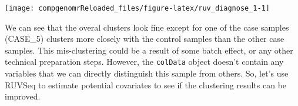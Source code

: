\documentclass[12pt,]{krantz}
\newenvironment{Shaded}{\begin{snugshade}}{\end{snugshade}}
\newcommand{\CommentTok}[1]{\textcolor[rgb]{0.56,0.35,0.01}{\textit{#1}}}
\newcommand{\ControlFlowTok}[1]{\textcolor[rgb]{0.13,0.29,0.53}{\textbf{#1}}}
\newcommand{\DataTypeTok}[1]{\textcolor[rgb]{0.13,0.29,0.53}{#1}}
\newcommand{\DecValTok}[1]{\textcolor[rgb]{0.00,0.00,0.81}{#1}}
\newcommand{\KeywordTok}[1]{\textcolor[rgb]{0.13,0.29,0.53}{\textbf{#1}}}
\newcommand{\NormalTok}[1]{#1}
\newcommand{\OperatorTok}[1]{\textcolor[rgb]{0.81,0.36,0.00}{\textbf{#1}}}
\newcommand{\OtherTok}[1]{\textcolor[rgb]{0.56,0.35,0.01}{#1}}
\newcommand{\StringTok}[1]{\textcolor[rgb]{0.31,0.60,0.02}{#1}}
\begin{document}
\begin{Shaded}
\end{Shaded}

\begin{center}\texttt{[image: compgenomrReloaded\_files/figure-latex/ruv\_diagnose\_1-1]} \end{center}

We can see that the overal clusters look fine except for one of the case samples (CASE\_5) clusters more closely with the control samples than the other case samples. This mis-clustering could be a result of some batch effect, or any other technical preparation steps. However, the \texttt{colData} object doesn't contain any variables that we can directly distinguish this sample from others. So, let's use RUVSeq to estimate potential covariates to see if the clustering results can be improved.
\end{document}
